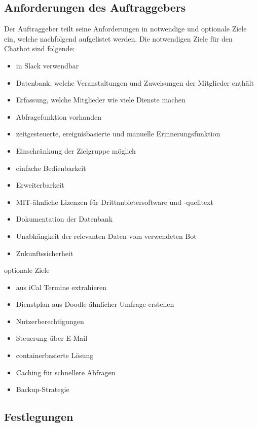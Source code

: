 \subsection{Anforderungen des Auftraggebers}
Der Auftraggeber teilt seine Anforderungen in notwendige und optionale Ziele ein, welche nachfolgend aufgelistet werden. Die notwendigen Ziele  für den Chatbot sind folgende:

\begin{itemize}
	\item in Slack verwendbar
	\item Datenbank, welche Veranstaltungen und Zuweisungen der Mitglieder enthält
	\item Erfassung, welche Mitglieder wie viele Dienste machen
	\item Abfragefunktion vorhanden
	\item zeitgesteuerte, ereignisbasierte und manuelle Erinnerungsfunktion
	\item Einschränkung der Zielgruppe möglich
	\item einfache Bedienbarkeit
	\item Erweiterbarkeit
	\item MIT-ähnliche Lizenzen für Drittanbietersoftware und -quelltext
	\item Dokumentation der Datenbank
	\item Unabhängkeit der relevanten Daten vom verwendeten Bot
	\item Zukunftssicherheit
\end{itemize}


optionale Ziele
\begin{itemize}
	\item aus iCal Termine extrahieren
	\item Dienstplan aus Doodle-ähnlicher Umfrage erstellen
	\item Nutzerberechtigungen
	\item Steuerung über E-Mail
	\item containerbasierte Lösung
	\item Caching für schnellere Abfragen
	\item Backup-Strategie
\end{itemize}


\subsection{Festlegungen}

